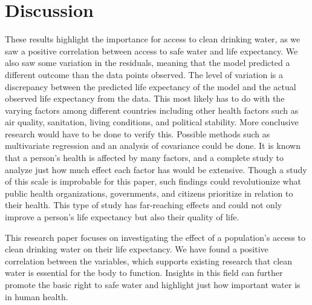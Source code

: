 \documentclass[12pt]{article}
\begin{document}
\section{Discussion}

These results highlight the importance for access to clean drinking water, as we saw a positive correlation between access to safe water and life expectancy. We also saw some variation in the residuals, meaning that the model predicted a different outcome than the data points observed. The level of variation is a discrepancy between the predicted life expectancy of the model and the actual observed life expectancy from the data. This most likely has to do with the varying factors among different countries including other health factors such as air quality, sanitation, living conditions, and political stability. More conclusive research would have to be done to verify this. Possible methods such as multivariate regression and an analysis of covariance could be done. It is known that a person's health is affected by many factors, and a complete study to analyze just how much effect each factor has would be extensive. Though a study of this scale is improbable for this paper, such findings could revolutionize what public health organizations, governments, and citizens prioritize in relation to their health. This type of study has far-reaching effects and could not only improve a person's life expectancy but also their quality of life.

\vspace{15pt}

This research paper focuses on investigating the effect of a population's access to clean drinking water on their life expectancy. We have found a positive correlation between the variables, which supports existing research that clean water is essential for the body to function. Insights in this field can further promote the basic right to safe water and highlight just how important water is in human health.


\newpage



\end{document}
